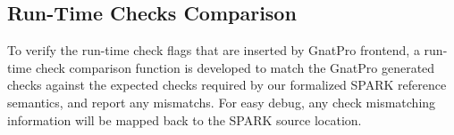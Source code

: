 \subsection{Run-Time Checks Comparison}
To verify the run-time check flags that are inserted by GnatPro frontend, a
run-time check comparison function is developed to match the GnatPro generated
checks against the expected checks required by our formalized SPARK reference
semantics, and report any mismatchs. For easy debug, any check mismatching
information will be mapped back to the SPARK source location.



